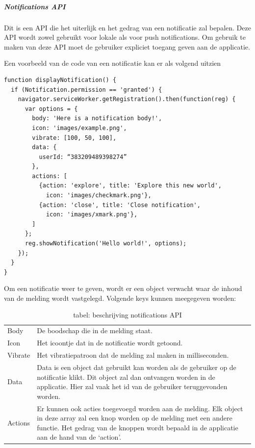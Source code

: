 \subparagraph{Notifications API}
Dit is een API die het uiterlijk en het gedrag van een notificatie zal bepalen. Deze API wordt zowel gebruikt voor lokale als voor push notifications.
Om gebruik te maken van deze API moet de gebruiker expliciet toegang geven aan de applicatie.

Een voorbeeld van de code van een notificatie kan er als volgend uitzien



\begin{lstlisting}
function displayNotification() {
  if (Notification.permission == 'granted') {
    navigator.serviceWorker.getRegistration().then(function(reg) {
      var options = {
        body: 'Here is a notification body!',
        icon: 'images/example.png',
        vibrate: [100, 50, 100],
        data: {
          userId: “383209489398274”
        },
        actions: [
          {action: 'explore', title: 'Explore this new world',
            icon: 'images/checkmark.png'},
          {action: 'close', title: 'Close notification',
            icon: 'images/xmark.png'},
        ]
      };
      reg.showNotification('Hello world!', options);
    });
  }
}
\end{lstlisting}


Om een notificatie weer te geven, wordt er een object verwacht waar de inhoud van de melding wordt vastgelegd. Volgende keys kunnen meegegeven worden:


\begin{table}[]
\begin{tabular}{ll}
Body    & De boodschap die in de melding staat.\\
Icon    & Het icoontje dat in de notificatie wordt getoond.\\
Vibrate & Het vibratiepatroon dat de melding zal maken in milliseconden.\\
Data    & Data is een object dat gebruikt kan worden als de gebruiker op de notificatie klikt. Dit object zal dan ontvangen worden in de applicatie. Hier zal vaak het id van de gebruiker teruggevonden worden.\\
Actions & Er kunnen ook acties toegevoegd worden aan de melding. Elk object in deze array zal een knop worden op de melding met een andere functie. Het gedrag van de knoppen wordt bepaald in de applicatie aan de hand van de ‘action’.
\end{tabular}
\caption{tabel: beschrijving notifications API}
\label{tab:notificatie code}
\end{table}

